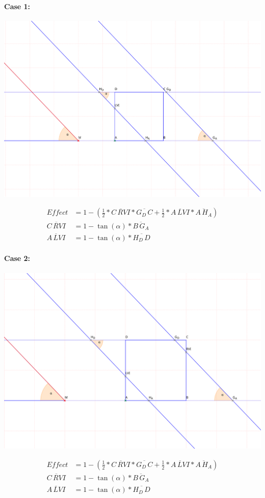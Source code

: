 \documentclass[a4paper,10pt,fleqn]{scrartcl}
\begin{document}
\paragraph{Case 1:}
\begin{minipage}{0.8\textwidth}
\includegraphics[width=\textwidth]{case1}
\end{minipage}
\begin{align*}
Effect &= 1 - (\frac{1}{2} * \overline{C\,RVI} * \overline{G_D\,C} + \frac{1}{2} * \overline{A\,LVI} * \overline{A\,H_A})\\
\overline{C\,RVI} &=  1 - \tan(\alpha) * \overline{B\,G_A}\\
\overline{A\,LVI} &=  1 - \tan(\alpha) * \overline{H_D\,D}
\end{align*}
\paragraph{Case 2:}
\begin{minipage}{0.8\textwidth}
\includegraphics[width=\textwidth]{case2}
\end{minipage}
\begin{align*}
Effect &= 1 - (\frac{1}{2} * \overline{C\,RVI} * \overline{G_D\,C} + \frac{1}{2} * \overline{A\,LVI} * \overline{A\,H_A})\\
\overline{C\,RVI} &=  1 - \tan(\alpha) * \overline{B\,G_A}\\
\overline{A\,LVI} &=  1 - \tan(\alpha) * \overline{H_D\,D}
\end{align*}
\end{document}
